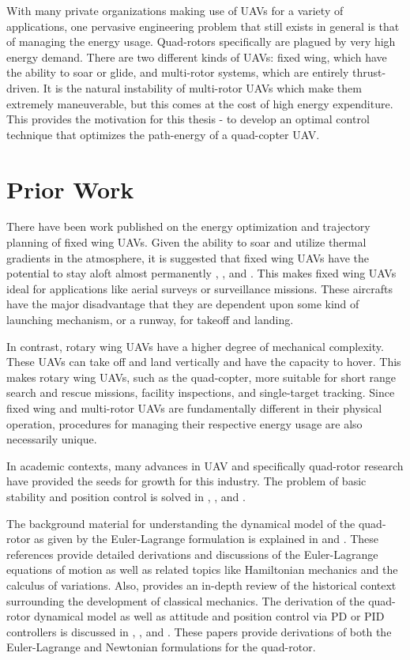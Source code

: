 With many private organizations making use of UAVs for a variety of applications, one pervasive engineering problem that still exists in general is that of managing the energy usage. Quad-rotors specifically are plagued by very high energy demand. There are two different kinds of UAVs: fixed wing, which have the ability to soar or glide, and multi-rotor systems, which are entirely thrust-driven. It is the natural instability of multi-rotor UAVs which make them extremely maneuverable, but this comes at the cost of high energy expenditure. This provides the motivation for this thesis - to develop an optimal control technique that optimizes the path-energy of a quad-copter UAV.


\section{Prior Work}

There have been work published on the energy optimization and trajectory planning of fixed wing UAVs. Given the ability to soar and utilize thermal gradients in the atmosphere, it is suggested that fixed wing UAVs have the potential to stay aloft almost permanently \cite{langelaan2007long}, \cite{klesh2009solar}, and \cite{lawrance2009guidance}.  This makes fixed wing UAVs ideal for applications like aerial surveys or surveillance missions. These aircrafts have the major disadvantage that they are dependent upon some kind of launching mechanism, or a runway, for takeoff and landing.

In contrast, rotary wing UAVs have a higher degree of mechanical complexity. These UAVs can take off and land vertically and have the capacity to hover. This makes rotary wing UAVs, such as the quad-copter, more suitable for short range search and rescue missions, facility inspections, and single-target tracking. Since fixed wing and multi-rotor UAVs are fundamentally different in their physical operation, procedures for managing their respective energy usage are also necessarily unique.

In academic contexts, many advances in UAV and specifically quad-rotor research have provided the seeds for growth for this industry. The problem of basic stability and position control is solved in \cite{erginer2007modeling}, \cite{bouabdallah2004pid}, and \cite{Luukkonen}.


The background material for understanding the dynamical model of the quad-rotor as given by the Euler-Lagrange formulation is explained in \cite{marion1995classical} and  \cite{cornelius1970variational}. These references provide detailed derivations and discussions of the Euler-Lagrange equations of motion as well as related topics like Hamiltonian mechanics and the calculus of variations. Also, \cite{cornelius1970variational} provides an in-depth review of the historical context surrounding the development of classical mechanics. The derivation of the quad-rotor dynamical model as well as attitude and position control via PD or PID controllers is discussed in \cite{erginer2007modeling}, \cite{bouabdallah2004pid}, and  \cite{Luukkonen}. These papers provide derivations of both the Euler-Lagrange and Newtonian formulations for the quad-rotor.

